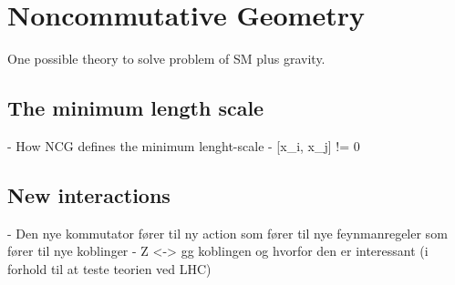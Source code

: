 \section{Noncommutative Geometry}

One possible theory to solve problem of SM plus gravity.

\subsection{The minimum length scale}
- How NCG defines the minimum lenght-scale
- [x_i, x_j] != 0

\subsection{New interactions}
- Den nye kommutator fører til ny action som fører til nye feynmanregeler som fører til nye koblinger
- Z <-> gg koblingen og hvorfor den er interessant (i forhold til at teste teorien ved LHC)